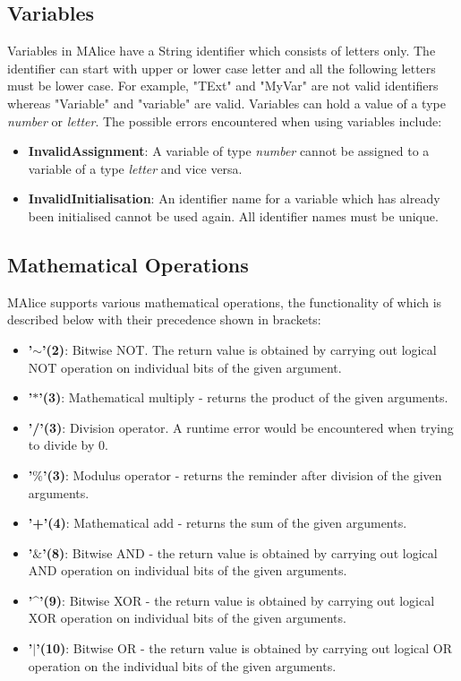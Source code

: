 \documentclass[a4wide, 11pt]{article}
\begin{document}
	\subsection{Variables}
		\label{sec:var}
			Variables in MAlice have a String identifier which consists of letters only.
			The identifier can start with upper or lower case letter and all the 
			following letters must be lower case. For example, "TExt" and "MyVar" are not 
			valid identifiers whereas "Variable" and "variable" are valid. Variables 
			can hold a value of a type \emph{number} or \emph{letter}. The possible errors encountered
			when using variables include:
			\begin{itemize}
				\item {\bf InvalidAssignment}: A variable of type \emph{number} cannot be 
					assigned to a variable of a type \emph{letter} and vice versa.
				\item {\bf InvalidInitialisation}: An identifier name for a variable which 
					has already been initialised cannot	be used again. All identifier names 
					must be unique.
			\end{itemize}
	
	\subsection{Mathematical Operations}
	\label{sec:mathOper}
		MAlice supports various mathematical operations, the functionality of which is 
		described below with their precedence shown in brackets:
		\begin{itemize}
			\item {\bf '$\mathtt{\sim}$'(2)}: Bitwise NOT. The return value is obtained by carrying
				out logical NOT operation on individual bits of the given argument.
			\item {\bf '$\ast$'(3)}: Mathematical multiply - returns the product of the
				given arguments.
			\item {\bf '/'(3)}: Division operator. A runtime error would be encountered 
				when trying to	divide by 0.
			\item {\bf '$\%$'(3)}: Modulus operator - returns the reminder after division of 
				the given arguments.
			\item {\bf '+'(4)}: Mathematical add - returns the sum of the given arguments.
			\item {\bf '$\&$'(8)}: Bitwise AND - the return value is obtained by carrying out 
				logical AND operation on individual bits of the given arguments.
			\item {\bf '\^{ }'(9)}: Bitwise XOR - the return value is obtained by carrying out 
				logical XOR operation on individual bits of the given arguments.
			\item {\bf '$\mid$'(10)}: Bitwise OR - the return value is obtained by carrying out 
				logical OR operation on the individual bits of the given arguments.
		\end{itemize}
 
\end{document}
